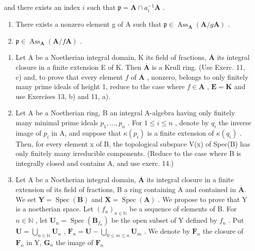 and there exists an index \(i\) such that \(\mathfrak{p} = \mathbf{A} \cap a_i^{-1}\mathbf{A}\) .

\begin{enumerate}
\def\labelenumi{\alph{enumi})}
\setcounter{enumi}{3}
\item
  There exists a nonzero element g of A such that \(\mathfrak{p} \in \operatorname{Ass}_{\mathbf{A}}(\mathbf{A}/g\mathbf{A})\) .
\item
  \(\mathfrak{p} \in \operatorname{Ass}_{\mathbf{A}}(\mathbf{A}/f\mathbf{A})\) .
\end{enumerate}

\begin{enumerate}
\def\labelenumi{\arabic{enumi})}
\setcounter{enumi}{13}
\item
  Let A be a Noetherian integral domain, K its field of fractions, \(\overline{\mathbf{A}}\) its integral closure in a finite extension E of K. Then \(\overline{\mathbf{A}}\) is a Krull ring. (Use Exerc. 11, c) and, to prove that every element \(f\) of \(\overline{\mathbf{A}}\) , nonzero, belongs to only finitely many prime ideals of height 1, reduce to the case where \(f \in \mathbf{A}\) , \(\mathbf{E} = \mathbf{K}\) and use Exercises 13, b) and 11, a).
\item
  Let A be a Noetherian ring, B an integral A-algebra having only finitely many minimal prime ideals \(p_{1}, \ldots, p_{n}\) . For \(1 \leqslant i \leqslant n\) , denote by \(q_{i}\) the inverse image of \(p_{i}\) in A, and suppose that \(\kappa(p_{i})\) is a finite extension of \(\kappa(q_{i})\) . Then, for every element x of B, the topological subspace V(x) of Spec(B) has only finitely many irreducible components. (Reduce to the case where B is integrally closed and contains A, and use exerc. 14.)
\item
  Let A be a Noetherian integral domain, \(\overline{\mathbf{A}}\) its integral closure in a finite extension of its field of fractions, B a ring containing A and contained in \(\overline{\mathbf{A}}\). We set \(\mathbf{Y} = \operatorname{Spec}(\mathbf{B})\) and \(\mathbf{X} = \operatorname{Spec}(\mathbf{A})\) . We propose to prove that Y is a noetherian space. Let \((f_n)_{n \in \mathbb{N}}\) be a sequence of elements of B. For \(n \in \mathbb{N}\) , let \(\mathbf{U}_n = \operatorname{Spec}(\mathbf{B}_{f_n})\) be the open subset of Y defined by \(f_n\) . Put \(\mathbf{U} = \bigcup_{n \in \mathbb{N}} \mathbf{U}_n\) , \(\mathbf{F}_n = \mathbf{U} - \bigcup_{0 \leqslant m \leqslant n} \mathbf{U}_m\) . We denote by \(\overline{\mathbf{F}}_n\) the closure of \(\mathbf{F}_n\) in Y, \(\mathbf{G}_n\) the image of \(\mathbf{F}_n\)
\end{enumerate}

